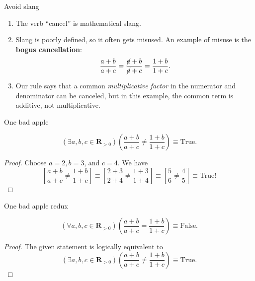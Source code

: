 \documentclass[portrait,fleqn,12pt]{beamer}
\newcommand{\reals}{\mathbf{R}}
\newenvironment{handlist}
   {\begin{enumerate}[\faHandPointRight]
       \addtolength{\itemsep}{0.0\itemsep}}
     {\end{enumerate}}
\begin{document}
\begin{frame}{Avoid slang}

\begin{handlist}

\item The verb ``cancel''  is mathematical slang.  
\item Slang is poorly defined, so it  often gets misused. An example of misuse is the \textbf{bogus cancellation}:
\begin{equation*}
   \frac{a+b}{a+c} =  \frac{\cancel{a}+b}{\cancel{a} +c} = \frac{1 + b}{1 + c}.
\end{equation*}
\item Our rule says that a common \emph{multiplicative factor} in the numerator and denominator can be canceled, but in this example, the common term is additive, not multiplicative.
\end{handlist}

\end{frame}

\begin{frame}{One bad apple}
\begin{theorem}
  \begin{equation*}
    \left(\exists a,b,c \in \reals_{>0}\right)
       \left(\frac{a+b}{a+c} \neq \frac{1 + b}{1 + c} \right) \equiv \mbox{True}.
 \end{equation*}
\end{theorem}
\begin{proof} Choose $a=2,b=3$, and $c=4$. We have
  \begin{equation*}
    \left[\frac{a+b}{a+c} \neq \frac{1 + b}{1 + c} \right] \equiv
    \left[\frac{2+3}{2+4} \neq \frac{1 + 3}{1 + 4} \right]  \equiv
    \left [\frac{5}{6} \neq \frac{4}{5} \right]  \equiv \mbox{True!}
  \end{equation*}
\end{proof}
\end{frame}

\begin{frame}{One bad apple redux}
  \begin{theorem}
    \begin{equation*}
      \left(\forall  a,b,c \in \reals_{>0}\right)
         \left(\frac{a+b}{a+c} = \frac{1 + b}{1 + c} \right) \equiv \mbox{False}.
   \end{equation*}
  \end{theorem}
  \begin{proof} The given statement is logically equivalent to 
    \begin{equation*}
      \left(\exists a,b,c \in \reals_{>0}\right)
      \left(\frac{a+b}{a+c} \neq \frac{1 + b}{1 + c} \right) \equiv \mbox{True}.
    \end{equation*}
    \end{proof}
  \end{frame}
\end{document}
